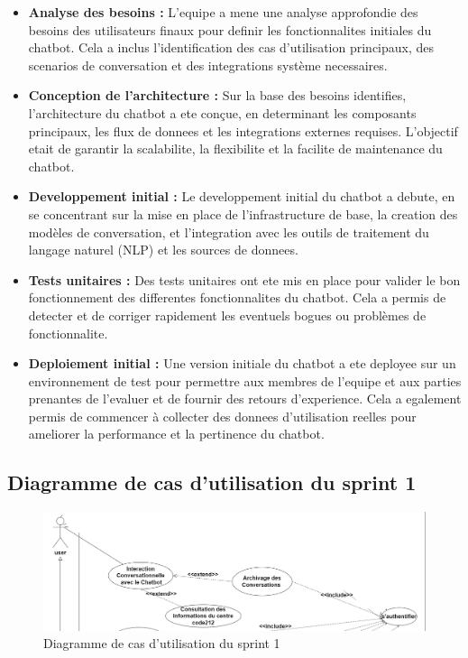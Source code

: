 \documentclass[a4paper, 11pt, openany]{report}
\begin{document}
\begin{itemize}
    \item \textbf{Analyse des besoins :} L'equipe a mene une analyse approfondie des besoins des utilisateurs finaux pour definir les fonctionnalites initiales du chatbot. Cela a inclus l'identification des cas d'utilisation principaux, des scenarios de conversation et des integrations système necessaires.
    
    \item \textbf{Conception de l'architecture :} Sur la base des besoins identifies, l'architecture du chatbot a ete conçue, en determinant les composants principaux, les flux de donnees et les integrations externes requises. L'objectif etait de garantir la scalabilite, la flexibilite et la facilite de maintenance du chatbot.
    
    \item \textbf{Developpement initial :} Le developpement initial du chatbot a debute, en se concentrant sur la mise en place de l'infrastructure de base, la creation des modèles de conversation, et l'integration avec les outils de traitement du langage naturel (NLP) et les sources de donnees.
    
    \item \textbf{Tests unitaires :} Des tests unitaires ont ete mis en place pour valider le bon fonctionnement des differentes fonctionnalites du chatbot. Cela a permis de detecter et de corriger rapidement les eventuels bogues ou problèmes de fonctionnalite.
    
    \item \textbf{Deploiement initial :} Une version initiale du chatbot a ete deployee sur un environnement de test pour permettre aux membres de l'equipe et aux parties prenantes de l'evaluer et de fournir des retours d'experience. Cela a egalement permis de commencer à collecter des donnees d'utilisation reelles pour ameliorer la performance et la pertinence du chatbot.
\end{itemize}

\subsection{Diagramme de cas d'utilisation du sprint 1}
\begin{figure}[H]
\centering
\includegraphics[width=\textwidth]{sprint1-usecase.png}
\caption{Diagramme de cas d'utilisation du sprint 1}
\label{fig:sprint1_usecase}
\end{figure}
\end{document}
